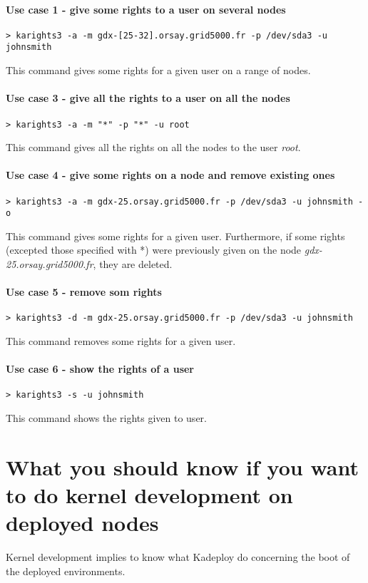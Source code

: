 \documentclass[a4wide,10pt,oneside]{book}
\begin{document}
\paragraph{Use case 1 - give some rights to a user on several nodes}
\begin{verbatim}
> karights3 -a -m gdx-[25-32].orsay.grid5000.fr -p /dev/sda3 -u johnsmith
\end{verbatim}
This command gives some rights for a given user on a range of nodes.

\paragraph{Use case 3 - give all the rights to a user on all the nodes}
\begin{verbatim}
> karights3 -a -m "*" -p "*" -u root
\end{verbatim}
This command gives all the rights on all the nodes to the user \textit{root}.

\paragraph{Use case 4 - give some rights on a node and remove existing ones}
\begin{verbatim}
> karights3 -a -m gdx-25.orsay.grid5000.fr -p /dev/sda3 -u johnsmith -o
\end{verbatim}
This command gives some rights for a given user. Furthermore, if some rights (excepted those specified with *) were previously given on the node \textit{gdx-25.orsay.grid5000.fr}, they are deleted.

\paragraph{Use case 5 - remove som rights}
\begin{verbatim}
> karights3 -d -m gdx-25.orsay.grid5000.fr -p /dev/sda3 -u johnsmith
\end{verbatim}
This command removes some rights for a given user.

\paragraph{Use case 6 - show the rights of a user}
\begin{verbatim}
> karights3 -s -u johnsmith
\end{verbatim}
This command shows the rights given to user.


\section{What you should know if you want to do kernel development on deployed nodes}
Kernel development implies to know what Kadeploy do concerning the boot of the deployed environments.
\end{document}
